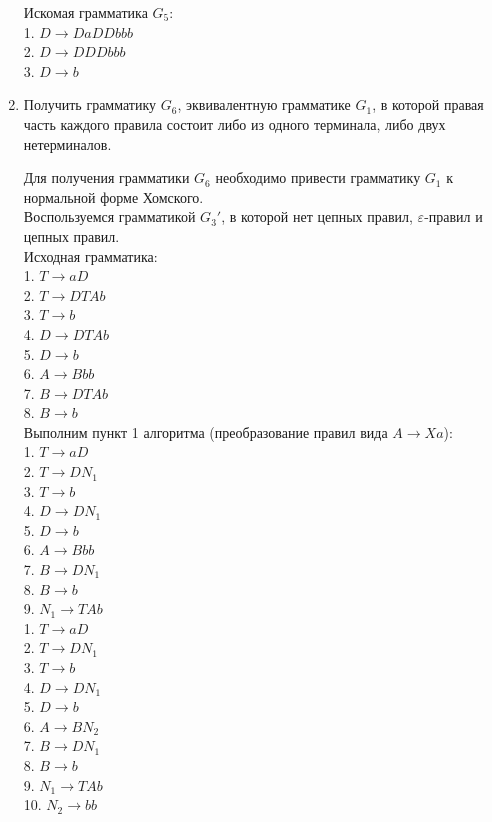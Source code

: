 \documentclass[a4paper,14pt]{extarticle}
\begin{document}
\begin{enumerate}[1.]
Искомая грамматика $G_5$:\\
1. $D \rightarrow DaDDbbb$\\
2. $D \rightarrow DDDbbb$\\
3. $D \rightarrow b$\\

\item Получить грамматику $G_6$, эквивалентную грамматике $G_1$, в которой
правая часть каждого правила состоит либо из одного терминала, либо двух нетерминалов.

Для получения грамматики $G_6$ необходимо привести грамматику $G_1$ 
к нормальной форме Хомского.\\
Воспользуемся грамматикой $G_3'$, в которой нет цепных правил, $\varepsilon$-правил
и цепных правил.\\
Исходная грамматика:\\
1. $T \rightarrow aD$\\
2. $T \rightarrow DTAb$\\
3. $T \rightarrow b$\\
4. $D \rightarrow DTAb$\\
5. $D \rightarrow b$\\
6. $A \rightarrow Bbb$\\
7. $B \rightarrow DTAb$\\
8. $B \rightarrow b$\\

Выполним пункт 1 алгоритма (преобразование правил вида $A \rightarrow Xa$):\\
1. $T \rightarrow aD$\\
2. $T \rightarrow DN_1$\\
3. $T \rightarrow b$\\
4. $D \rightarrow DN_1$\\
5. $D \rightarrow b$\\
6. $A \rightarrow Bbb$\\
7. $B \rightarrow DN_1$\\
8. $B \rightarrow b$\\
9. $N_1 \rightarrow TAb$\\

1. $T \rightarrow aD$\\
2. $T \rightarrow DN_1$\\
3. $T \rightarrow b$\\
4. $D \rightarrow DN_1$\\
5. $D \rightarrow b$\\
6. $A \rightarrow BN_2$\\
7. $B \rightarrow DN_1$\\
8. $B \rightarrow b$\\
9. $N_1 \rightarrow TAb$\\
10. $N_2 \rightarrow bb$\\


\end{enumerate}
\end{document}
